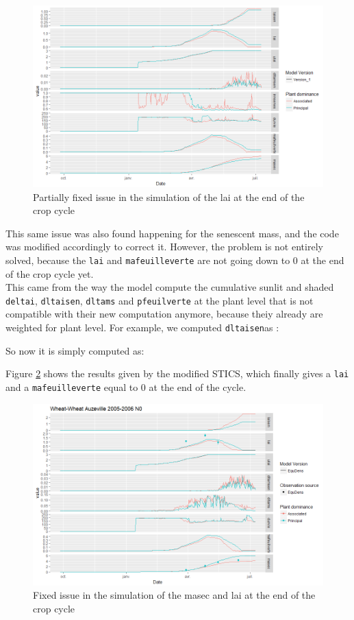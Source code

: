 \documentclass[
]{book}
\begin{document}
\begin{figure}
\centering
\includegraphics{img/ReSenFixed.png}
\caption{\label{fig:ReSenFixed}Partially fixed issue in the simulation of the lai at the end of the crop cycle}
\end{figure}

This same issue was also found happening for the senescent mass, and the code was modified accordingly to correct it. However, the problem is not entirely solved, because the \texttt{lai} and \texttt{mafeuilleverte} are not going down to 0 at the end of the crop cycle yet.\\
This came from the way the model compute the cumulative sunlit and shaded \texttt{deltai}, \texttt{dltaisen}, \texttt{dltams} and \texttt{pfeuilverte} at the plant level that is not compatible with their new computation anymore, because theiy already are weighted for plant level.
For example, we computed \texttt{dltaisen}as :

So now it is simply computed as:

Figure \ref{fig:ReSenFixed2} shows the results given by the modified STICS, which finally gives a \texttt{lai} and a \texttt{mafeuilleverte} equal to 0 at the end of the cycle.

\begin{figure}
\centering
\includegraphics{img/ReSenFixed2.png}
\caption{\label{fig:ReSenFixed2}Fixed issue in the simulation of the masec and lai at the end of the crop cycle}
\end{figure}
\end{document}
